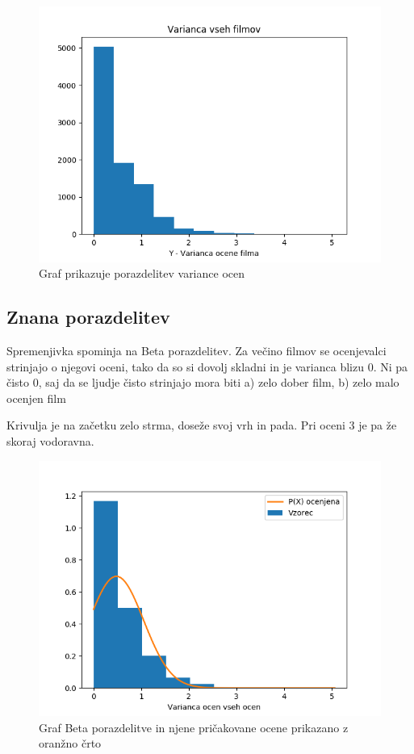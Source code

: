 \documentclass[a4paper,11pt]{article}
\begin{document}
		\begin{figure}[!htb]
			\begin{center}
				\includegraphics[scale=1.0]{slike/graph1_varianca.png}
				\caption{Graf prikazuje porazdelitev variance ocen}
				\label{slika1}
			\end{center}
		\end{figure}

	
	\subsection{Znana porazdelitev}
		Spremenjivka spominja na Beta porazdelitev. Za večino filmov se ocenjevalci strinjajo o njegovi oceni, tako da so si dovolj skladni in je varianca blizu 0. Ni pa čisto 0, saj da se ljudje čisto strinjajo mora biti a) zelo dober film, b) zelo malo ocenjen film
		
		Krivulja je na začetku zelo strma, doseže svoj vrh in pada. Pri oceni 3 je pa že skoraj vodoravna.
		
		\begin{figure}[!htb]
			\begin{center}
				\includegraphics[scale=1.0]{slike/graph2_porazdelitve.png}
				\caption{Graf Beta porazdelitve in njene pričakovane ocene prikazano z oranžno črto}
				\label{slika2}
			\end{center}
		\end{figure}
\end{document}
